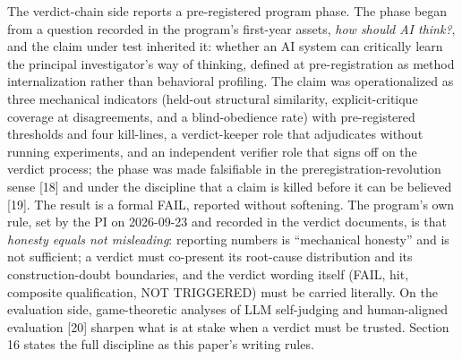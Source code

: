 \documentclass[11pt]{article}
\begin{document}
\noindent The verdict-chain side reports a pre-registered program phase. The phase began from a question recorded in the program's first-year assets, \emph{how should AI think?}, and the claim under test inherited it: whether an AI system can critically learn the principal investigator's way of thinking, defined at pre-registration as method internalization rather than behavioral profiling. The claim was operationalized as three mechanical indicators (held-out structural similarity, explicit-critique coverage at disagreements, and a blind-obedience rate) with pre-registered thresholds and four kill-lines, a verdict-keeper role that adjudicates without running experiments, and an independent verifier role that signs off on the verdict process; the phase was made falsifiable in the preregistration-revolution sense [18] and under the discipline that a claim is killed before it can be believed [19]. The result is a formal FAIL, reported without softening. The program's own rule, set by the PI on 2026-09-23 and recorded in the verdict documents, is that \emph{honesty equals not misleading}: reporting numbers is ``mechanical honesty'' and is not sufficient; a verdict must co-present its root-cause distribution and its construction-doubt boundaries, and the verdict wording itself (FAIL, hit, composite qualification, NOT TRIGGERED) must be carried literally. On the evaluation side, game-theoretic analyses of LLM self-judging and human-aligned evaluation [20] sharpen what is at stake when a verdict must be trusted. Section 16 states the full discipline as this paper's writing rules.\par
\end{document}
